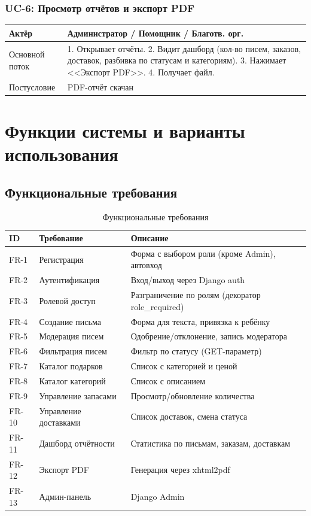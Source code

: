 \documentclass[14pt,a4paper]{extarticle}
\begin{document}
\subsubsection{UC-6: Просмотр отчётов и экспорт PDF}

\begin{table}[H]
\centering
\small
\begin{tabular}{|L{3cm}|L{10cm}|}
\hline
Актёр & Администратор / Помощник / Благотв. орг. \\
\hline
Основной поток & 1. Открывает отчёты. 2. Видит дашборд (кол-во писем, заказов, доставок, разбивка по статусам и категориям). 3. Нажимает <<Экспорт PDF>>. 4. Получает файл. \\
\hline
Постусловие & PDF-отчёт скачан \\
\hline
\end{tabular}
\end{table}

\newpage

\section{Функции системы и варианты использования}

\subsection{Функциональные требования}

\begin{table}[H]
\centering
\caption{Функциональные требования}
\label{tab:func_req}
\small
\begin{tabular}{|C{0.8cm}|L{4cm}|L{8cm}|}
\hline
\textbf{ID} & \textbf{Требование} & \textbf{Описание} \\
\hline
FR-1 & Регистрация & Форма с выбором роли (кроме Admin), автовход \\
\hline
FR-2 & Аутентификация & Вход/выход через Django auth \\
\hline
FR-3 & Ролевой доступ & Разграничение по ролям (декоратор role\_required) \\
\hline
FR-4 & Создание письма & Форма для текста, привязка к ребёнку \\
\hline
FR-5 & Модерация писем & Одобрение/отклонение, запись модератора \\
\hline
FR-6 & Фильтрация писем & Фильтр по статусу (GET-параметр) \\
\hline
FR-7 & Каталог подарков & Список с категорией и ценой \\
\hline
FR-8 & Каталог категорий & Список с описанием \\
\hline
FR-9 & Управление запасами & Просмотр/обновление количества \\
\hline
FR-10 & Управление доставками & Список доставок, смена статуса \\
\hline
FR-11 & Дашборд отчётности & Статистика по письмам, заказам, доставкам \\
\hline
FR-12 & Экспорт PDF & Генерация через xhtml2pdf \\
\hline
FR-13 & Админ-панель & Django Admin \\
\hline
\end{tabular}
\end{table}
\end{document}
